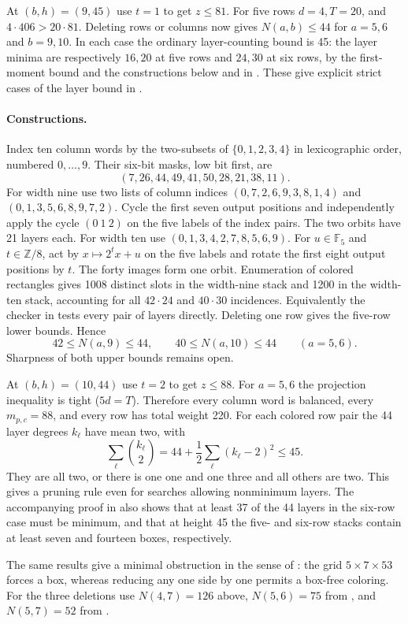 \documentclass[11pt]{article}
\newcommand{\Z}{\mathbb Z}
\newcommand{\F}{\mathbb F}
\begin{document}
At $(b,h)=(9,45)$ use $t=1$ to get $z\le81$. For five rows $d=4,T=20$, and $4\cdot406>20\cdot81$. Deleting rows or columns now gives $N(a,b)\le44$ for $a=5,6$ and $b=9,10$. In each case the ordinary layer-counting bound is 45: the layer minima are respectively $16,20$ at five rows and $24,30$ at six rows, by the first-moment bound and the constructions below and in \cite{data}. These give explicit strict cases of the layer bound in \cite[Problem 3]{alm}.

\paragraph{Constructions.}
Index ten column words by the two-subsets of $\{0,1,2,3,4\}$ in lexicographic order, numbered $0,\ldots,9$. Their six-bit masks, low bit first, are
\[
 (7,26,44,49,41,50,28,21,38,11).
\]
For width nine use two lists of column indices
$(0,7,2,6,9,3,8,1,4)$ and $(0,1,3,5,6,8,9,7,2)$.
Cycle the first seven output positions and independently apply the cycle $(0\ 1\ 2)$ on the five labels of the index pairs. The two orbits have 21 layers each. For width ten use $(0,1,3,4,2,7,8,5,6,9)$. For $u\in\F_5$ and $t\in\Z/8$, act by $x\mapsto2^t x+u$ on the five labels and rotate the first eight output positions by $t$. The forty images form one orbit. Enumeration of colored rectangles gives 1008 distinct slots in the width-nine stack and 1200 in the width-ten stack, accounting for all $42\cdot24$ and $40\cdot30$ incidences. Equivalently the checker in \cite{data} tests every pair of layers directly. Deleting one row gives the five-row lower bounds. Hence
\[
 42\le N(a,9)\le44,\qquad 40\le N(a,10)\le44\qquad(a=5,6).
\]
Sharpness of both upper bounds remains open.

At $(b,h)=(10,44)$ use $t=2$ to get $z\le88$. For $a=5,6$ the projection inequality is tight ($5d=T$). Therefore every column word is balanced, every $m_{p,c}=88$, and every row has total weight 220. For each colored row pair the 44 layer degrees $k_\ell$ have mean two, with
\[
 \sum_\ell\binom{k_\ell}{2}=44+\frac12\sum_\ell(k_\ell-2)^2\le45 .
\]
They are all two, or there is one one and one three and all others are two. This gives a pruning rule even for searches allowing nonminimum layers. The accompanying proof in \cite{data} also shows that at least 37 of the 44 layers in the six-row case must be minimum, and that at height 45 the five- and six-row stacks contain at least seven and fourteen boxes, respectively.

The same results give a minimal obstruction in the sense of \cite{cfp}: the grid $5\times7\times53$ forces a box, whereas reducing any one side by one permits a box-free coloring. For the three deletions use $N(4,7)=126$ above, $N(5,6)=75$ from \cite{alm}, and $N(5,7)=52$ from \cite{data}.
\end{document}
